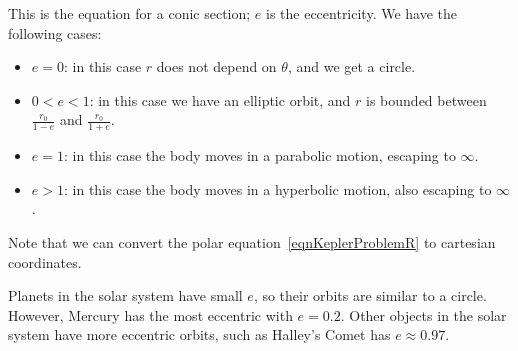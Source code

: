 \documentclass[../Main.tex]{subfiles}
\begin{document}
This is the equation for a conic section; $e$ is the eccentricity. We have the following cases:
\begin{itemize}
    \item $e = 0$: in this case $r$ does not depend on $\theta$, and we get a circle.
    \item $0 < e < 1$: in this case we have an elliptic orbit, and $r$ is bounded between $\frac{r_0}{1-e}$ and $\frac{r_0}{1+e}$.
    \item $e = 1$: in this case the body moves in a parabolic motion, escaping to $\infty$.
    \item $e > 1$: in this case the body moves in a hyperbolic motion, also escaping to $\infty$.
\end{itemize}
Note that we can convert the polar equation~\ref{eqnKeplerProblemR} to cartesian coordinates.\par
Planets in the solar system have small $e$, so their orbits are similar to a circle. However, Mercury has the most eccentric with $e = 0.2$. Other objects in the solar system have more eccentric orbits, such as Halley's Comet has $e \approx 0.97$.
\end{document}

